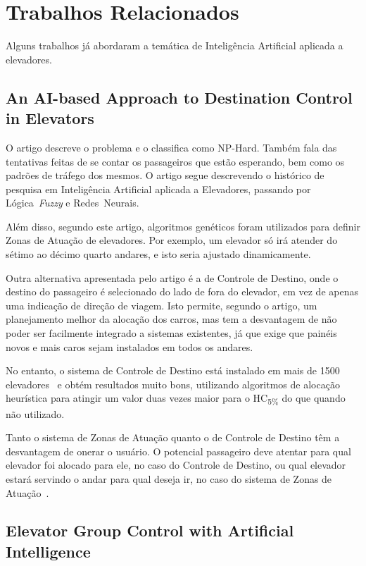 \chapter{\label{chap:related}Trabalhos Relacionados}

Alguns trabalhos já abordaram a temática de Inteligência Artificial aplicada a
elevadores. %

\section{An AI-based Approach to Destination Control in
Elevators~\cite{KOEHLEROTTIGER02}} O artigo descreve o problema e o classifica
como NP-Hard. Também fala das tentativas feitas de se contar os passageiros que
estão esperando, bem como os padrões de tráfego dos mesmos. O artigo segue
descrevendo o histórico de pesquisa em Inteligência Artificial aplicada a
Elevadores, passando por Lógica~\textit{Fuzzy} e Redes~Neurais.

Além disso, segundo este artigo, algoritmos genéticos foram utilizados para
definir Zonas de Atuação de elevadores. Por exemplo, um elevador só irá atender
do sétimo ao décimo quarto andares, e isto seria ajustado dinamicamente.

Outra alternativa apresentada pelo artigo é a de Controle de Destino, onde o
destino do passageiro é selecionado do lado de fora do elevador, em vez de
apenas uma indicação de direção de viagem. Isto permite, segundo o artigo, um
planejamento melhor da alocação dos carros, mas tem a desvantagem de não poder
ser facilmente integrado a sistemas existentes, já que exige que painéis novos e
mais caros sejam instalados em todos os andares.

No entanto, o sistema de Controle de Destino está instalado em mais de 1500
elevadores~\cite{KOEHLEROTTIGER02} e obtém resultados muito bons, utilizando
algoritmos de alocação heurística para atingir um valor duas vezes maior para o
HC\textsubscript{5\%} do que quando não utilizado.

Tanto o sistema de Zonas de Atuação quanto o de Controle de Destino têm a
desvantagem de onerar o usuário. O potencial passageiro deve atentar para qual
elevador foi alocado para ele, no caso do Controle de Destino, ou qual elevador
estará servindo o andar para qual deseja ir, no caso do sistema de Zonas de
Atuação~\cite{KOEHLEROTTIGER02}.

\section{Elevator Group Control with Artificial Intelligence~\cite{marja97}}

